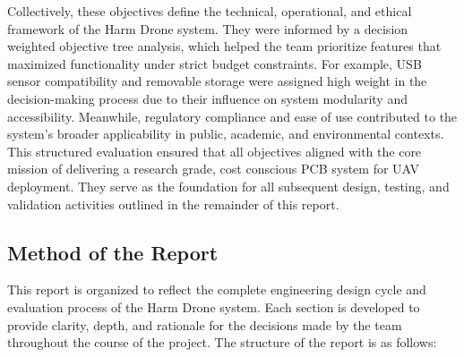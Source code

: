 \documentclass[12pt]{article}
\begin{document}
\par Collectively, these objectives define the technical, operational, and ethical framework of the Harm Drone system. They were informed by a decision weighted objective tree analysis, which helped the team prioritize features that maximized functionality under strict budget constraints. For example, USB sensor compatibility and removable storage were assigned high weight in the decision-making process due to their influence on system modularity and accessibility. Meanwhile, regulatory compliance and ease of use contributed to the system's broader applicability in public, academic, and environmental contexts. This structured evaluation ensured that all objectives aligned with the core mission of delivering a research grade, cost conscious PCB system for UAV deployment. They serve as the foundation for all subsequent design, testing, and validation activities outlined in the remainder of this report.

\subsection{Method of the Report}

\par This report is organized to reflect the complete engineering design cycle and evaluation process of the Harm Drone system. Each section is developed to provide clarity, depth, and rationale for the decisions made by the team throughout the course of the project. The structure of the report is as follows:
\end{document}
